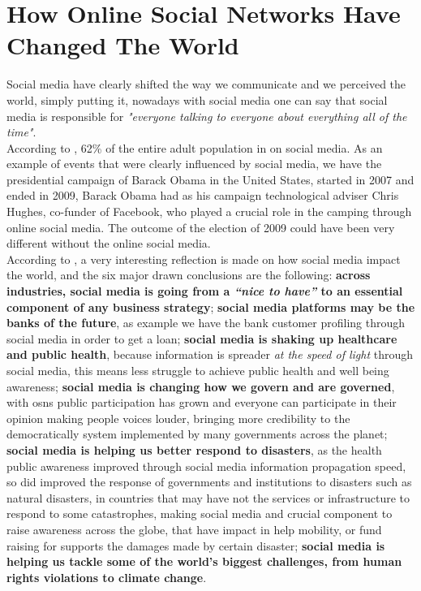 \section{How Online Social Networks Have Changed The World}

Social media have clearly shifted the way we communicate and we perceived the world, simply putting it, nowadays with social media one can say that social media is responsible for \textit{"everyone talking to everyone about everything all of the time"}.\\
\indent According to \citep{demogsmu}, 62\% of the entire adult population in on social media. As an example of events that were clearly influenced by social media, we have the presidential campaign of Barack Obama in the United States, started in 2007 and ended in 2009, Barack Obama had as his campaign technological adviser Chris Hughes, co-funder of Facebook, who played a crucial role in the camping through online social media. The outcome of the election of 2009 could have been very different without the online social media.\\
\indent According to \citep{6wayschange}, a very interesting reflection is made on how social media impact the world, and the six major drawn conclusions are the following: \textbf{across industries, social media is going from a \textit{“nice to have”} to an essential component of any business strategy}; \textbf{social media platforms may be the banks of the future}, as example we have the bank customer profiling through social media in order to get a loan; \textbf{social media is shaking up healthcare and public health}, because information is spreader \textit{at the speed of light} through social media, this means less struggle to achieve public health and well being awareness; \textbf{social media is changing how we govern and are governed}, with \glspl{osn} public participation has grown and everyone can participate in their opinion making people voices louder, bringing more credibility to the democratically system implemented by many governments across the planet; \textbf{social media is helping us better respond to disasters}, as the health public awareness improved through social media information propagation speed, so did improved the response of governments and institutions to disasters such as natural disasters, in countries that may have not the services or infrastructure to respond to some catastrophes, making social media and crucial component to raise awareness across the globe, that have impact in help mobility, or fund raising for supports the damages made by certain disaster; \textbf{social media is helping us tackle some of the world’s biggest challenges, from human rights violations to climate change}.\\
